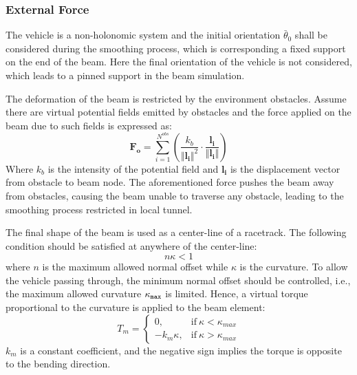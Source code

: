 \documentclass[conference, onecolumn]{IEEEtran}
\begin{document}
\subsubsection{External Force}

The vehicle is a non-holonomic system and the initial orientation $\bar{\theta}_0$ shall be considered during the smoothing process, which is corresponding a fixed support on the end of the beam. Here the final orientation of the vehicle is not considered, which leads to a pinned support in the beam simulation.

The deformation of the beam is restricted by the environment obstacles. Assume there are virtual potential fields emitted by obstacles and the force applied on the beam due to such fields is expressed as:
\begin{equation}	
    \boldsymbol{F_o}  = \sum_{i = 1}^{N^{obs}} \left( \frac{k_{b}}{\Vert  \boldsymbol{l_i}\Vert ^2 } \cdot\frac{\boldsymbol{l_i}}{ \Vert \boldsymbol{l_i} \Vert  }\right)
	\label{obstaclesforce}
\end{equation}
Where $k_{b}$ is the intensity of the potential field and $\boldsymbol{l_i}$ is the displacement vector from obstacle to beam node.
The aforementioned force pushes the beam away from obstacles, causing the beam unable to traverse any obstacle, leading to the smoothing process restricted in local tunnel. 

The final shape of the beam is used as a center-line of a racetrack. The following condition should be satisfied at anywhere of the center-line:
\begin{equation}	
    n \kappa<1
	\label{trackoffsetcondition}
\end{equation}
where $n$ is the maximum allowed normal offset while $\kappa$ is the curvature. To allow the vehicle passing through, the minimum normal offset should be controlled, i.e., the maximum allowed curvature $\kappa_{\tt max}$ is limited. Hence, a virtual torque proportional to the curvature is applied to the beam element:
\begin{equation}	
	T_m=
    \begin{cases}
      0, & \text{if}\ \kappa<\kappa_{max} \\
      -k_m\kappa, & \text{if}\ \kappa>\kappa_{max} 
    \end{cases}
\end{equation}
$k_m$ is a constant coefficient, and the negative sign implies the torque is opposite to the bending direction.
\end{document}
